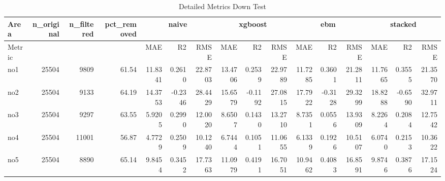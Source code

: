 \begin{landscape}
\begin{table}
\centering
\caption{Detailed Metrics Down Test}
\label{tab:metrics_down_test}
\begin{tabular}{|l|rrr|rrr|rrr|rrr|rrr|}
\toprule
Area & n_original & n_filtered & pct_removed & \multicolumn{3}{c|}{naive} & \multicolumn{3}{c|}{xgboost} & \multicolumn{3}{c|}{ebm} & \multicolumn{3}{c|}{stacked} \\
\midrule
Metric & & & & MAE & R2 & RMSE & MAE & R2 & RMSE & MAE & R2 & RMSE & MAE & R2 & RMSE \\
   no1 & 25504 & 9809 & 61.54 & 11.8341 & 0.2610 & 22.8703 & 13.4706 & 0.2539 & 22.9789 & 11.7285 & 0.3601 & 21.2811 & 11.7665 & 0.3555 & 21.3570 \\
   no2 & 25504 & 9133 & 64.19 & 14.3753 & -0.2346 & 28.4429 & 15.6579 & -0.1192 & 27.0815 & 17.7922 & -0.3128 & 29.3299 & 18.8288 & -0.6590 & 32.9711 \\
   no3 & 25504 & 9297 & 63.55 & 5.9205 & 0.2990 & 12.0020 & 8.6507 & 0.1430 & 13.2710 & 8.7351 & 0.0556 & 13.9309 & 8.2264 & 0.2084 & 12.7542 \\
   no4 & 25504 & 11001 & 56.87 & 4.7729 & 0.2509 & 10.1240 & 6.7444 & 0.1051 & 11.0655 & 6.1339 & 0.1926 & 10.5107 & 6.0740 & 0.2153 & 10.3622 \\
   no5 & 25504 & 8890 & 65.14 & 9.8454 & 0.3452 & 17.7363 & 11.0979 & 0.4191 & 16.7051 & 10.9462 & 0.4083 & 16.8591 & 9.8746 & 0.3876 & 17.1524 \\
\bottomrule
\end{tabular}
\end{table}

\end{landscape}